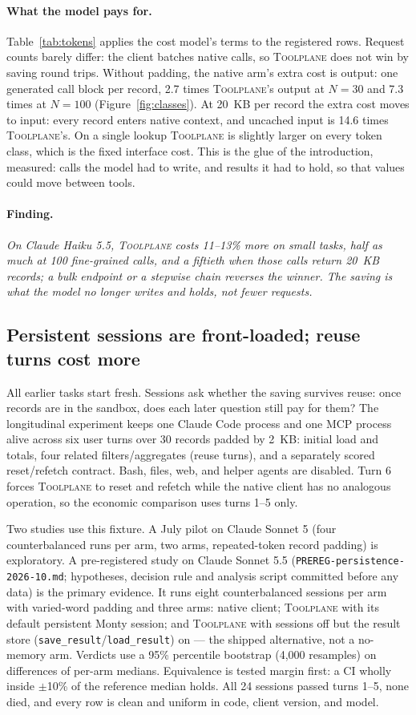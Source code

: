 \documentclass[10pt,twocolumn]{article}
\newcommand{\toolplane}{\textsc{Toolplane}\xspace}
\newcommand{\finding}[1]{\paragraph{Finding.} \emph{#1}}
\begin{document}
\paragraph{What the model pays for.}  Table~\ref{tab:tokens} applies
the cost model's terms to the registered rows.  Request counts barely differ:
the client batches native calls, so \toolplane does not win by saving round
trips.  Without padding, the native arm's extra cost is output: one generated
call block per record, 2.7 times \toolplane's output at $N=30$ and 7.3 times
at $N=100$ (Figure~\ref{fig:classes}).  At 20~KB per record the extra cost moves to input: every record
enters native context, and uncached input is 14.6 times \toolplane's.  On a
single lookup \toolplane is slightly larger on every token class, which is the
fixed interface cost.  This is the glue of the introduction, measured: calls
the model had to write, and results it had to hold, so that values could move
between tools.

\finding{On Claude Haiku 5.5, \toolplane costs 11--13\% more on small tasks, half as
much at 100 fine-grained calls, and a fiftieth when those calls return 20~KB
records; a bulk endpoint or a stepwise chain reverses the winner.  The saving
is what the model no longer writes and holds, not fewer requests.}

\subsection{Persistent sessions are front-loaded; reuse turns cost more}
\label{sec:sessions}

All earlier tasks start fresh.  Sessions ask whether the saving survives
reuse: once records are in the sandbox, does each later question still pay
for them?  The longitudinal experiment keeps one Claude
Code process and one MCP process alive across six user turns over 30 records
padded by 2~KB: initial load and totals, four related filters/aggregates
(reuse turns), and a separately scored reset/refetch contract.  Bash, files,
web, and helper agents are disabled.  Turn 6 forces \toolplane to reset and
refetch while the native client has no analogous operation, so the economic
comparison uses turns 1--5 only.

Two studies use this fixture.  A July pilot on Claude Sonnet 5 (four
counterbalanced runs per arm, two arms, repeated-token record padding) is
exploratory.  A pre-registered study on Claude Sonnet 5.5
(\texttt{PREREG-persistence-2026-10.md}; hypotheses, decision rule and
analysis script committed before any data) is the primary evidence.  It runs
eight counterbalanced sessions per arm with varied-word padding and three arms:
native client; \toolplane with its default persistent Monty session; and
\toolplane with sessions off but the result store
(\texttt{save\_result}/\texttt{load\_result}) on --- the shipped alternative,
not a no-memory arm.  Verdicts use a 95\% percentile bootstrap (4,000
resamples) on differences of per-arm medians.  Equivalence is tested margin
first: a CI wholly inside $\pm$10\% of the reference median holds.  All 24
sessions passed turns 1--5, none died, and every row is clean and uniform in
code, client version, and model.
\end{document}
